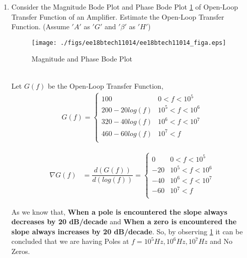 \begin{enumerate}[label=\thesubsection.\arabic*.,ref=\thesubsection.\theenumi]
\item Consider the Magnitude Bode Plot and Phase Bode Plot \ref{fig:Bode} of Open-Loop Transfer Function of an Amplifier. Estimate the Open-Loop Transfer Function. (Assume $'A'$ as $'G'$ and $'\beta'$ as $'H'$)
\begin{figure}[ht!]
	\begin{center}
		\texttt{[image: ./figs/ee18btech11014/ee18btech11014\_figa.eps]}
	\end{center}
	\caption{Magnitude and Phase Bode Plot}
	\label{fig:Bode}
\end{figure}\\
\solution Let $G(f)$ be the Open-Loop Transfer Function,
\begin{align}
G(f) = 
\begin{cases} 
      100 & 0 < f < 10^{5} \\
      200-20log(f) & 10^{5} < f < 10^{6} \\
      320-40log(f) & 10^{6} < f < 10^{7} \\
      460-60log(f) & 10^{7} < f  \\
\end{cases}
\end{align}

\begin{align}
\nabla G(f) &= \dfrac{d(G(f))}{d(log(f))} =
\begin{cases} 
        0 & 0 < f < 10^{5} \\
      -20 & 10^{5} < f < 10^{6} \\
      -40 & 10^{6} < f < 10^{7} \\
      -60 & 10^{7} < f  \\ 
\end{cases}
\end{align}

As we know that, \textbf{When a pole is encountered the slope always decreases by 20 dB/decade} and \textbf{When a zero is encountered the slope always increases by 20 dB/decade}. So, by observing \ref{fig:Bode} it can be concluded that we are having Poles at $f=10^{5} Hz, 10^{6} Hz, 10^{7} Hz$ and No Zeros.\\


\end{enumerate}
